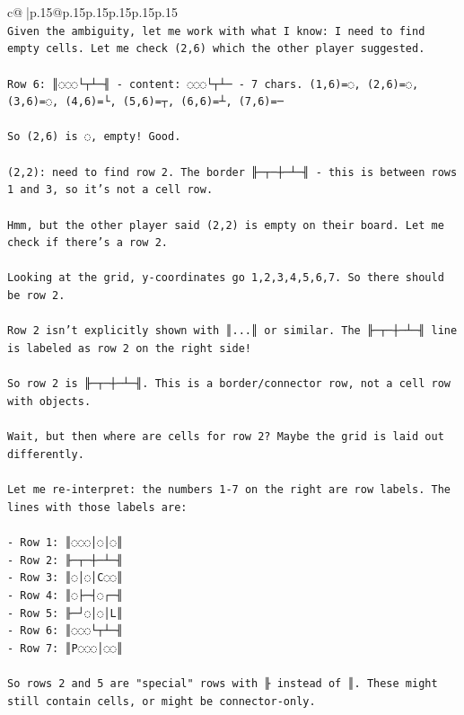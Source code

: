 \documentclass{article}
\begin{document}
{\begin{supertabular}{c@{$\;$}|p{.15\linewidth}@{}p{.15\linewidth}p{.15\linewidth}p{.15\linewidth}p{.15\linewidth}p{.15\linewidth}}
{{{\\ 
\texttt{Given the ambiguity, let me work with what I know: I need to find empty cells. Let me check (2,6) which the other player suggested.} \\
\\ 
\texttt{Row 6: ║◌◌◌└┬┴─╢ {-} content: ◌◌◌└┬┴─ {-} 7 chars. (1,6)=◌, (2,6)=◌, (3,6)=◌, (4,6)=└, (5,6)=┬, (6,6)=┴, (7,6)=─} \\
\\ 
\texttt{So (2,6) is ◌, empty! Good.} \\
\\ 
\texttt{(2,2): need to find row 2. The border ╟─┬─┼─┴─╢ {-} this is between rows 1 and 3, so it's not a cell row.} \\
\\ 
\texttt{Hmm, but the other player said (2,2) is empty on their board. Let me check if there's a row 2.} \\
\\ 
\texttt{Looking at the grid, y{-}coordinates go 1,2,3,4,5,6,7. So there should be row 2.} \\
\\ 
\texttt{Row 2 isn't explicitly shown with ║...║ or similar. The ╟─┬─┼─┴─╢ line is labeled as row 2 on the right side!} \\
\\ 
\texttt{So row 2 is ╟─┬─┼─┴─╢. This is a border/connector row, not a cell row with objects.} \\
\\ 
\texttt{Wait, but then where are cells for row 2? Maybe the grid is laid out differently.} \\
\\ 
\texttt{Let me re{-}interpret: the numbers 1{-}7 on the right are row labels. The lines with those labels are:} \\
\\ 
\texttt{{-} Row 1: ║◌◌◌│◌│◌║} \\
\texttt{{-} Row 2: ╟─┬─┼─┴─╢ } \\
\texttt{{-} Row 3: ║◌│◌│C◌◌║} \\
\texttt{{-} Row 4: ║◌├─┤◌┌─╢} \\
\texttt{{-} Row 5: ╟─┘◌│◌│L║} \\
\texttt{{-} Row 6: ║◌◌◌└┬┴─╢} \\
\texttt{{-} Row 7: ║P◌◌◌│◌◌║} \\
\\ 
\texttt{So rows 2 and 5 are "special" rows with ╟ instead of ║. These might still contain cells, or might be connector{-}only.} \\
}}}
\end{supertabular}}
\end{document}
